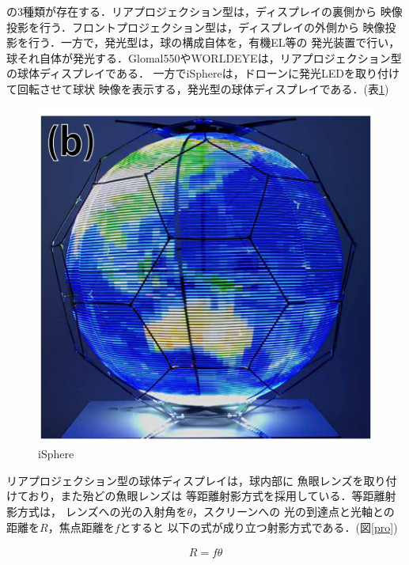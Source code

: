 の3種類が存在する．リアプロジェクション型は，ディスプレイの裏側から
映像投影を行う．フロントプロジェクション型は，ディスプレイの外側から
映像投影を行う．一方で，発光型は，球の構成自体を，有機EL等の
発光装置で行い，球それ自体が発光する．Glomal550やWORLDEYEは，リアプロジェクション型
の球体ディスプレイである．
一方でiSphereは，ドローンに発光LEDを取り付けて回転させて球状
映像を表示する，発光型の球体ディスプレイである．(表\ref{isphere})
\begin{figure}[tp]
  \centering
  \includegraphics[scale=1.0]{fig/isphere.png}
  \caption{iSphere\cite{23}}\label{isphere}
\end{figure}

リアプロジェクション型の球体ディスプレイは，球内部に
魚眼レンズを取り付けており，また殆どの魚眼レンズは
等距離射影方式を採用している．等距離射影方式は，
レンズへの光の入射角を$\theta$，スクリーンへの
光の到達点と光軸との距離を$R$，焦点距離を$f$とすると
以下の式が成り立つ射影方式である．(図\ref{pro})

\begin{eqnarray}
  R = f\theta \nonumber \\
\end{eqnarray}

